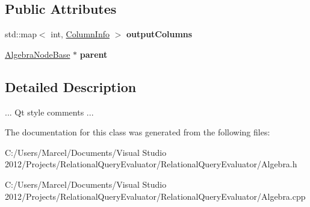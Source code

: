 \subsection*{Public Attributes}
\begin{DoxyCompactItemize}
\item 
\hypertarget{class_algebra_node_base_ac59c590aea4f109c7fab18f714c588c1}{std\+::map$<$ int, \hyperlink{class_column_info}{Column\+Info} $>$ {\bfseries output\+Columns}}\label{class_algebra_node_base_ac59c590aea4f109c7fab18f714c588c1}

\item 
\hypertarget{class_algebra_node_base_a5b2834cce900dec172763d4ef4b38f66}{\hyperlink{class_algebra_node_base}{Algebra\+Node\+Base} $\ast$ {\bfseries parent}}\label{class_algebra_node_base_a5b2834cce900dec172763d4ef4b38f66}

\end{DoxyCompactItemize}


\subsection{Detailed Description}
... Qt style comments ... 

The documentation for this class was generated from the following files\+:\begin{DoxyCompactItemize}
\item 
C\+:/\+Users/\+Marcel/\+Documents/\+Visual Studio 2012/\+Projects/\+Relational\+Query\+Evaluator/\+Relational\+Query\+Evaluator/Algebra.\+h\item 
C\+:/\+Users/\+Marcel/\+Documents/\+Visual Studio 2012/\+Projects/\+Relational\+Query\+Evaluator/\+Relational\+Query\+Evaluator/Algebra.\+cpp\end{DoxyCompactItemize}
